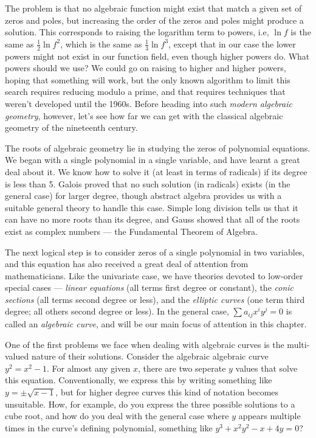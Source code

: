 The problem is that no algebraic function might exist that match a
given set of zeros and poles, but increasing the order of the zeros
and poles might produce a solution.  This corresponds to raising the
logarithm term to powers, i.e, $\ln f$ is the same as $\frac{1}{2} \ln
f^2$, which is the same as $\frac{1}{3} \ln f^3$, except that in our
case the lower powers might not exist in our function field, even
though higher powers do.  What powers should we use?  We could go on
raising to higher and higher powers, hoping that something will work,
but the only known algorithm to limit this search requires reducing
modulo a prime, and that requires techniques that weren't developed
until the 1960s.  Before heading into such {\it modern algebraic
geometry}, however, let's see how far we can get with the classical
algebraic geometry of the nineteenth century.


The roots of algebraic geometry lie in studying the zeros of
polynomial equations.  We began with a single polynomial in a single
variable, and have learnt a great deal about it.  We know how to solve
it (at least in terms of radicals) if its degree is less than 5.
Galois proved that no such solution (in radicals) exists (in the
general case) for larger degree, though abstract algebra provides us
with a suitable general theory to handle this case.  Simple long
division tells us that it can have no more roots than its degree, and
Gauss showed that all of the roots exist as complex numbers --- the
Fundamental Theorem of Algebra.

The next logical step is to consider zeros of a single polynomial in
two variables, and this equation has also received a great deal of
attention from mathematicians.  Like the univariate case, we have
theories devoted to low-order special cases --- {\it linear equations}
(all terms first degree or constant), the {\it conic sections} (all
terms second degree or less), and the {\it elliptic curves} (one term
third degree; all others second degree or less).  In the general case,
$\sum a_{ij} x^i y^j = 0$ is called an {\it algebraic curve},
and will be our main focus of attention in this chapter.


One of the first problems we face when dealing with algebraic curves
is the multi-valued nature of their solutions.  Consider the algebraic
algebraic curve $y^2 = x^2 - 1$.  For almost any given $x$,
there are two seperate $y$ values that solve this equation.
Conventionally, we
express this by writing something like $y = \pm\sqrt{x-1}$, but for
higher degree curves this kind of notation becomes unsuitable.  How,
for example, do you express the three possible solutions to a cube
root, and how do you deal with the general case where $y$ appears
multiple times in the curve's defining polynomial, something
like $y^3 + x^2y^2 - x + 4y=0$?

